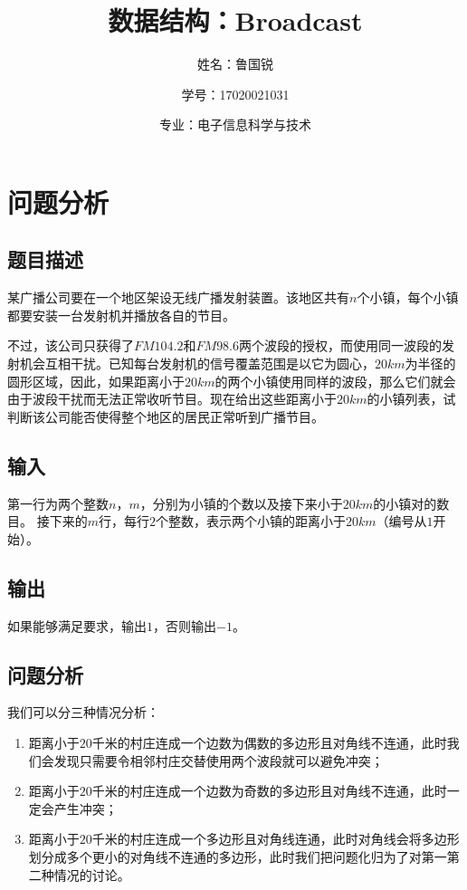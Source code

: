 \documentclass[UTF8]{ctexart}
\title{数据结构：Broadcast}
\author{姓名：鲁国锐 \protect\newline
\and 学号：17020021031 \\
\and 专业：电子信息科学与技术}
\begin{document}
	\maketitle
	\renewcommand{\contentsname}{Contents}
	\tableofcontents
	\newpage
	
	\hypersetup{
	bookmarks=true,
	colorlinks=true,
	linkcolor=red,
	urlcolor=blue
	}
	\section{问题分析}
	\subsection{题目描述}
	\indent 某广播公司要在一个地区架设无线广播发射装置。该地区共有$n$个小镇，每个小镇都要安装一台发射机并播放各自的节目。

	\indent 不过，该公司只获得了$FM104.2$和$FM98.6$两个波段的授权，而使用同一波段的发射机会互相干扰。已知每台发射机的信号覆盖范围是以它为圆心，$20km$为半径的圆形区域，因此，如果距离小于$20km$的两个小镇使用同样的波段，那么它们就会由于波段干扰而无法正常收听节目。现在给出这些距离小于$20km$的小镇列表，试判断该公司能否使得整个地区的居民正常听到广播节目。

     \subsection{输入}
     \indent 第一行为两个整数$n$，$m$，分别为小镇的个数以及接下来小于$20km$的小镇对的数目。 接下来的$m$行，每行$2$个整数，表示两个小镇的距离小于$20km$（编号从$1$开始）。
     
     \subsection{输出}
     \indent 如果能够满足要求，输出$1$，否则输出$-1$。

	\subsection{问题分析}\label{analysis}
	\indent 我们可以分三种情况分析：
	\begin{enumerate}[leftmargin=50pt]
	\item 距离小于$20$千米的村庄连成一个边数为偶数的多边形且对角线不连通，此时我们会发现只需要令相邻村庄交替使用两个波段就可以避免冲突；
	\item 距离小于$20$千米的村庄连成一个边数为奇数的多边形且对角线不连通，此时一定会产生冲突；
	\item 距离小于$20$千米的村庄连成一个多边形且对角线连通，此时对角线会将多边形划分成多个更小的对角线不连通的多边形，此时我们把问题化归为了对第一第二种情况的讨论。
	\end{enumerate}
	
\end{document}
